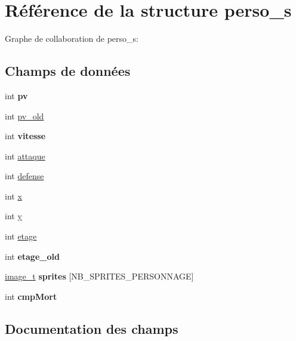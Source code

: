 \hypertarget{structperso__s}{}\section{Référence de la structure perso\+\_\+s}
\label{structperso__s}


Graphe de collaboration de perso\+\_\+s\+:
\subsection*{Champs de données}
\begin{DoxyCompactItemize}
\item 
\mbox{\label{structperso__s_ad17089bad3c048781a2add514f3f07d3}} 
int {\bfseries pv}
\item 
int \hyperlink{structperso__s_a297466e7436287f164f8657682eed1cc}{pv\+\_\+old}
\item 
\mbox{\label{structperso__s_a429c161b1be866d57eb970e20488653b}} 
int {\bfseries vitesse}
\item 
int \hyperlink{structperso__s_a3dfcf516a244c40d0cf30122d6044b38}{attaque}
\item 
int \hyperlink{structperso__s_a5b94d67fd2b1715891d29351ba2f79c6}{defense}
\item 
int \hyperlink{structperso__s_a99f045874e46e0662e64f0525172ad4c}{x}
\item 
int \hyperlink{structperso__s_a74f226bdc5f8237c573fa5f54d10a44e}{y}
\item 
int \hyperlink{structperso__s_a833e982a2a21762795c06ebbc0061f32}{etage}
\item 
\mbox{\label{structperso__s_a91fc1227b30f6b31c5f9ae9fda6cf90c}} 
int {\bfseries etage\+\_\+old}
\item 
\mbox{\label{structperso__s_ac7d1926bb25ca167223e5ff20e4dba43}} 
\hyperlink{structimage__t}{image\+\_\+t} {\bfseries sprites} \mbox{[}N\+B\+\_\+\+S\+P\+R\+I\+T\+E\+S\+\_\+\+P\+E\+R\+S\+O\+N\+N\+A\+GE\mbox{]}
\item 
\mbox{\label{structperso__s_a27499f2ab32de3b5493baa701e40bba8}} 
int {\bfseries cmp\+Mort}
\end{DoxyCompactItemize}


\subsection{Documentation des champs}
\mbox{\label{structperso__s_a3dfcf516a244c40d0cf30122d6044b38}} 
